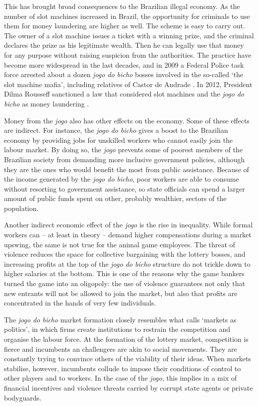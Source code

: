 \documentclass[a4paper,12pt]{article}
\begin{document}
This has brought broad consequences to the Brazilian illegal economy. As the number of slot machines increased in Brazil, the opportunity for criminals to use them for money laundering are higher as well. The scheme is easy to carry out. The owner of a slot machine issues a ticket with a winning prize, and the criminal declares the prize as his legitimate wealth. Then he can legally use that money for any purpose without raising suspicion from the authorities. The practice have become more widespread in the last decades, and in 2009 a Federal Police task force arrested about a dozen \textit{jogo do bicho} bosses involved in the so-called `the slot machine mafia', including relatives of Castor de Andrade \citep{estado2011cacaniquel}. In 2012, President Dilma Rousseff sanctioned a law that considered slot machines and the \textit{jogo do bicho} as money laundering \citep{agenciabrasil2012dilma}. 

Money from the \textit{jogo} also has other effects on the economy. Some of these effects are indirect. For instance, the \textit{jogo do bicho} gives a boost to the Brazilian economy by providing jobs for unskilled workers who cannot easily join the labour market. By doing so, the \textit{jogo} prevents some of poorest members of the Brazilian society from demanding more inclusive government policies, although they are the ones who would benefit the most from public assistance. Because of the income generated by the \textit{jogo do bicho}, poor workers are able to consume without resorting to government assistance, so state officials can spend a larger amount of public funds spent on other, probably wealthier, sectors of the population.

Another indirect economic effect of the \textit{jogo} is the rise in inequality. While formal workers can -- at least in theory -- demand higher compensations during a market upswing, the same is not true for the animal game employees. The threat of violence reduces the space for collective bargaining with the lottery bosses, and increasing profits at the top of the \textit{jogo do bicho} structure do not trickle down to higher salaries at the bottom. This is one of the reasons why the game bankers turned the game into an oligopoly: the use of violence guarantees not only that new entrants will not be allowed to join the market, but also that profits are concentrated in the hands of very few individuals.  

The \textit{jogo do bicho} market formation closely resembles what \citet{fligstein1996markets} calls `markets as politics', in which firms create institutions to restrain the competition and organise the labour force. At the formation of the lottery market, competition is fierce and incumbents an challengers are akin to social movements. They are constantly trying to convince others of the viability of their ideas. When markets stabilise, however, incumbents collude to impose their conditions of control to other players and to workers. In the case of the \textit{jogo}, this implies in a mix of financial incentives and violence threats carried by corrupt state agents or private bodyguards. 
\end{document}
